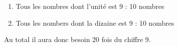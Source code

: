 %
%
    \begin{enumerate}
        \item Tous les nombres dont l'unité est 9 : 10 nombres
        \item Tous les nombers dont la dizaine est 9 : 10 nombres
    \end{enumerate}
    Au total il aura donc besoin 20 fois du chiffre 9.
